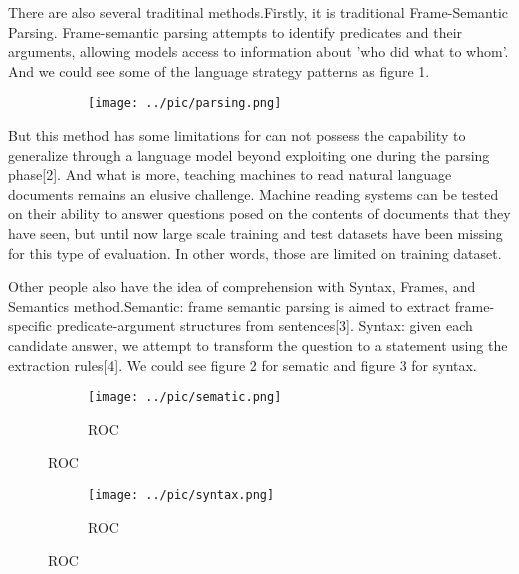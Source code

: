 \documentclass[runningheads,a4paper]{llncs}
\begin{document}
There are also several traditinal methods.Firstly, it is traditional Frame-Semantic Parsing. Frame-semantic parsing attempts to identify predicates and their arguments, allowing models access to information about 'who did what to whom'. And we could see some of the language strategy patterns as figure 1.

\begin{figure}[p]
	\centering
	\begin{subfigure}{.5\textwidth}
		\centering
		\texttt{[image: ../pic/parsing.png]}
		
		\label{figure 1:Frame-Semantic Parsing}
	\end{subfigure}	
\end{figure}


But this method has some limitations for can not possess the capability to generalize through a language model beyond exploiting one during the parsing phase[2]. And what is more, teaching machines to read natural language documents remains an elusive challenge. Machine reading systems can be tested on their ability to answer questions posed on the contents of documents that they have seen, but until now large scale training and test datasets have been missing for this type of evaluation. In other words, those are limited on training dataset.

Other people also have the idea of comprehension with Syntax, Frames, and Semantics method.Semantic: frame semantic parsing is aimed to extract frame-specific predicate-argument structures from sentences[3].
Syntax: given each candidate answer, we attempt to transform the question to a statement using the extraction rules[4]. We could see figure 2 for sematic and figure 3 for syntax.
\begin{figure}[p]
	\centering
	\begin{subfigure}{.5\textwidth}
		\centering
		\texttt{[image: ../pic/sematic.png]}
		\caption{ROC}
		\label{figure 2:sematic parsing}
	\end{subfigure}
	
\end{figure}

\begin{figure}[p]
	\centering
	\begin{subfigure}{.5\textwidth}
		\centering
		\texttt{[image: ../pic/syntax.png]}
		\caption{ROC}
		\label{figure 3:syntax}
	\end{subfigure}	
\end{figure}
\end{document}
